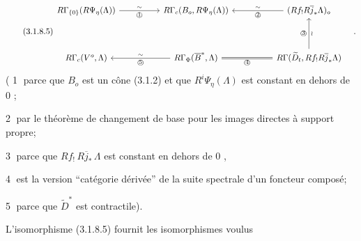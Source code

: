 \begin{equation}\tag{3.1.8.5}
\begin{tikzcd}[column sep=huge, row sep=huge]
R\Gamma_{\{0\}}(R\Psi_\eta(\Lambda)) \arrow[r, "\sim", "\text{\textcircled{1}}"'] & R\Gamma_c(B_o, R\Psi_\eta(\Lambda)) & (Rf_! R\overline{j}_* \Lambda)_o \arrow[l, "\sim"', "\text{\textcircled{2}}"] \\
R\Gamma_c(V^o, \Lambda) & R\Gamma_\Phi(\overline{B}^*, \Lambda) \arrow[l, "\sim"', "\text{\textcircled{5}}"] \arrow[r, equal, "\text{\textcircled{4}}"'] & R\Gamma(\widetilde{D}_t, Rf_! R\overline{j}_* \Lambda) \arrow[u, "\text{\textcircled{3}}", "\wr"']
\end{tikzcd}\quad .
\end{equation}
( \textcircled{1} parce que $B_o$ est un cône (3.1.2) et que $R^i\Psi_\eta(\Lambda)$ est constant en dehors de $0$ ;

\textcircled{2} par le théorème de changement de base pour les images directes à support propre;

\textcircled{3} parce que $Rf_! \, R\overline{j}_* \, \Lambda$ est constant en dehors de $0$ ,

\textcircled{4} est la version ``catégorie dérivée'' de la suite spectrale d'un foncteur composé;

\textcircled{5} parce que $\widetilde{D}^*$ est contractile).

L'isomorphisme (3.1.8.5) fournit les isomorphismes voulus 


